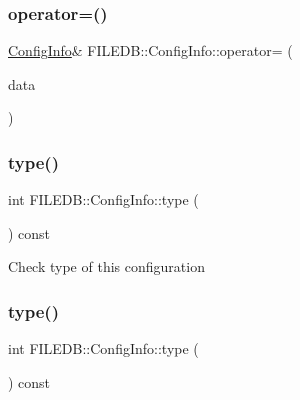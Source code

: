 \mbox{\label{classFILEDB_1_1ConfigInfo_addda23bfc94267dee10eb00355316514}} 
\subsubsection{\texorpdfstring{operator=()}{operator=()}\hspace{0.1cm}{\footnotesize\ttfamily [3/3]}}
{\footnotesize\ttfamily \mbox{\hyperlink{classFILEDB_1_1ConfigInfo}{Config\+Info}}\& F\+I\+L\+E\+D\+B\+::\+Config\+Info\+::operator= (\begin{DoxyParamCaption}\item[{const \mbox{\hyperlink{classFILEDB_1_1ConfigInfo}{Config\+Info}} \&}]{data }\end{DoxyParamCaption})}

\mbox{\label{classFILEDB_1_1ConfigInfo_a8053fc6dd889fb1e7c888359412fc0c7}} 
\subsubsection{\texorpdfstring{type()}{type()}\hspace{0.1cm}{\footnotesize\ttfamily [1/6]}}
{\footnotesize\ttfamily int F\+I\+L\+E\+D\+B\+::\+Config\+Info\+::type (\begin{DoxyParamCaption}\item[{void}]{ }\end{DoxyParamCaption}) const}

Check type of this configuration \mbox{\label{classFILEDB_1_1ConfigInfo_a8053fc6dd889fb1e7c888359412fc0c7}} 
\subsubsection{\texorpdfstring{type()}{type()}\hspace{0.1cm}{\footnotesize\ttfamily [2/6]}}
{\footnotesize\ttfamily int F\+I\+L\+E\+D\+B\+::\+Config\+Info\+::type (\begin{DoxyParamCaption}\item[{void}]{ }\end{DoxyParamCaption}) const}


